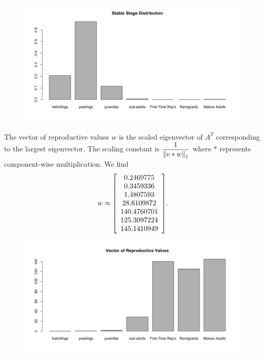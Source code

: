 \documentclass{article} %
\theoremstyle{plain}
\numberwithin{equation}{section} %
\numberwithin{figure}{section} %
\numberwithin{table}{section} %
\begin{document}
\begin{enumerate}[\ \ (a)]
        \begin{figure}[ht!]
            \centering
            \includegraphics[scale=0.45]{figure_1a.png}
        \end{figure}
        \FloatBarrier
        The vector of reproductive values $w$ is the scaled eigenvector of $A^T$ corresponding to the largest eigenvector.  The scaling constant is $\dfrac{1}{\norm{v*w}_1}$ where $*$ represents component-wise multiplication.  We find
        \begin{align*}
            w \approx \qty[\begin{array}{c}0.2469775 \\ 0.3459336 \\ 1.4807593 \\ 28.6109872 \\ 140.4760701 \\ 125.3097224 \\ 145.1410949\end{array}].
        \end{align*}
        \begin{figure}[ht!]
            \centering
            \includegraphics[scale=0.45]{figure_1b.png}
        \end{figure}

\end{enumerate}
\end{document}
